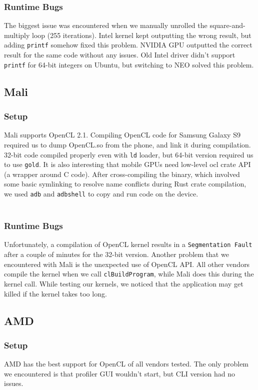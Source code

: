 \subsubsection{Runtime Bugs}
The biggest issue was encountered when we manually unrolled the square-and-multiply loop (255 iterations). Intel kernel kept outputting the wrong result, but adding \texttt{printf} somehow fixed this problem. NVIDIA GPU outputted the correct result for the same code without any issues. Old Intel driver didn't support \texttt{printf} for 64-bit integers on Ubuntu, but switching to NEO solved this problem. 

\subsection{Mali}
\subsubsection{Setup}
Mali supports OpenCL 2.1. Compiling OpenCL code for Samsung Galaxy S9 required us to dump OpenCL.so from the phone, and link it during compilation. 32-bit code compiled properly even with \texttt{ld} loader, but 64-bit version required us to use \texttt{gold}. It is also interesting that mobile GPUs need low-level ocl crate API (a wrapper around C code). After cross-compiling the binary, which involved some basic symlinking to resolve name conflicts during Rust crate compilation, we used \texttt{adb} and \texttt{adbshell} to copy and run code on the device.\\\\
\subsubsection{Runtime Bugs}
Unfortunately, a compilation of OpenCL kernel results in a \texttt{Segmentation Fault} after a couple of minutes for the 32-bit version. Another problem that we encountered with Mali is the unexpected use of OpenCL API. All other vendors compile the kernel when we call \texttt{clBuildProgram}, while Mali does this during the kernel call. While testing our kernels, we noticed that the application may get killed if the kernel takes too long.

\subsection{AMD}
\subsubsection{Setup}
AMD has the best support for OpenCL of all vendors tested. The only problem we encountered is that profiler GUI wouldn't start, but CLI version had no issues.
